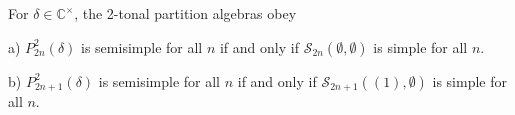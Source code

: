 \documentclass[reqno,10pt,a4paper]{amsart}
\newcommand{\C}{\mathbb{C}}
\newcommand{\blue}[1]{\textcolor{blue}{#1}}
\newcommand{\red}[1]{\textcolor{red}{#1}}
\newcommand{\ppm}[1]{\red{#1}}
\newcommand{\ca}[1]{\blue{#1}}
\newcommand{\nk}{n}  %
\newcommand{\cell}{\mathcal{S}}
\begin{document}
\medskip 

\begin{lem}\label{frecip}
For $\delta\in \C^\times$, the 2-tonal partition algebras 
obey

\noindent
a)  $P^2_{2\nk}(\delta)$ is semisimple for all $\nk$ if and only if
$\cell_{2\nk}({\emptyset},\emptyset)$ 
is simple for all $\nk$.


\noindent
b)  $P^2_{2\nk+1}(\delta)$ is semisimple for all $\nk$ if and only if
$\cell_{2\nk+1}({(1)},\emptyset)$ 
is simple for all $\nk$.
\end{lem}
\end{document}
